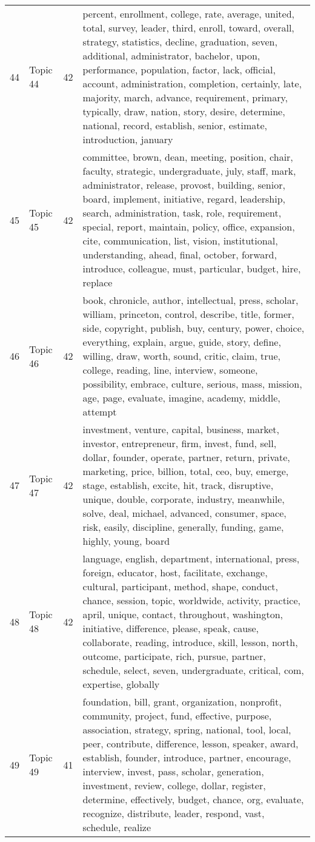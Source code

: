 \begin{table}[ht]
{\begin{tabularx}{\textwidth}{llrX}
   44 & Topic 44 & 42 & percent, enrollment, college, rate, average, united, total, survey, leader, third, enroll, toward, overall, strategy, statistics, decline, graduation, seven, additional, administrator, bachelor, upon, performance, population, factor, lack, official, account, administration, completion, certainly, late, majority, march, advance, requirement, primary, typically, draw, nation, story, desire, determine, national, record, establish, senior, estimate, introduction, january \\ 
   45 & Topic 45 & 42 & committee, brown, dean, meeting, position, chair, faculty, strategic, undergraduate, july, staff, mark, administrator, release, provost, building, senior, board, implement, initiative, regard, leadership, search, administration, task, role, requirement, special, report, maintain, policy, office, expansion, cite, communication, list, vision, institutional, understanding, ahead, final, october, forward, introduce, colleague, must, particular, budget, hire, replace \\ 
   46 & Topic 46 & 42 & book, chronicle, author, intellectual, press, scholar, william, princeton, control, describe, title, former, side, copyright, publish, buy, century, power, choice, everything, explain, argue, guide, story, define, willing, draw, worth, sound, critic, claim, true, college, reading, line, interview, someone, possibility, embrace, culture, serious, mass, mission, age, page, evaluate, imagine, academy, middle, attempt \\ 
   47 & Topic 47 & 42 & investment, venture, capital, business, market, investor, entrepreneur, firm, invest, fund, sell, dollar, founder, operate, partner, return, private, marketing, price, billion, total, ceo, buy, emerge, stage, establish, excite, hit, track, disruptive, unique, double, corporate, industry, meanwhile, solve, deal, michael, advanced, consumer, space, risk, easily, discipline, generally, funding, game, highly, young, board \\ 
   48 & Topic 48 & 42 & language, english, department, international, press, foreign, educator, host, facilitate, exchange, cultural, participant, method, shape, conduct, chance, session, topic, worldwide, activity, practice, april, unique, contact, throughout, washington, initiative, difference, please, speak, cause, collaborate, reading, introduce, skill, lesson, north, outcome, participate, rich, pursue, partner, schedule, select, seven, undergraduate, critical, com, expertise, globally \\ 
   49 & Topic 49 & 41 & foundation, bill, grant, organization, nonprofit, community, project, fund, effective, purpose, association, strategy, spring, national, tool, local, peer, contribute, difference, lesson, speaker, award, establish, founder, introduce, partner, encourage, interview, invest, pass, scholar, generation, investment, review, college, dollar, register, determine, effectively, budget, chance, org, evaluate, recognize, distribute, leader, respond, vast, schedule, realize \\ 

\end{tabularx}}
\end{table}
